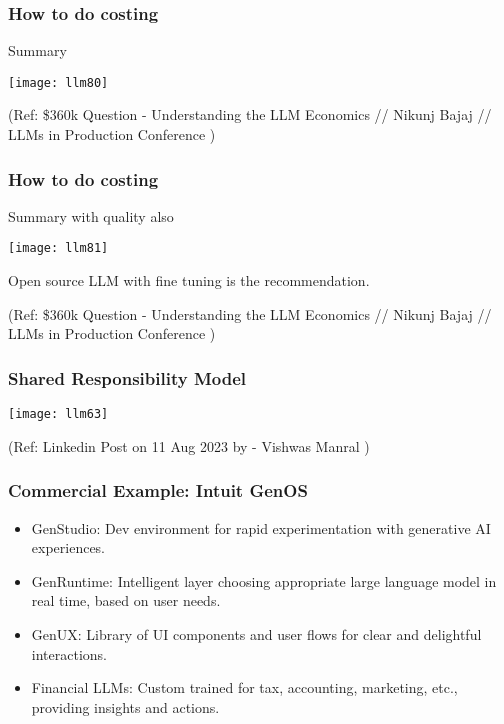 \begin{frame}[fragile]\frametitle{How to do costing}

Summary 

\begin{center}
\texttt{[image: llm80]}
\end{center}		



{\tiny (Ref: \$360k Question - Understanding the LLM Economics // Nikunj Bajaj // LLMs in Production Conference )}

\end{frame}

\begin{frame}[fragile]\frametitle{How to do costing}

Summary with quality also

\begin{center}
\texttt{[image: llm81]}
\end{center}		

Open source LLM with fine tuning is the recommendation.


{\tiny (Ref: \$360k Question - Understanding the LLM Economics // Nikunj Bajaj // LLMs in Production Conference )}

\end{frame}




\begin{frame}[fragile]\frametitle{Shared Responsibility Model}

\begin{center}
\texttt{[image: llm63]}
\end{center}		


{\tiny (Ref: Linkedin Post on 11 Aug 2023 by - Vishwas Manral )}

\end{frame}


\begin{frame}[fragile]\frametitle{Commercial Example: Intuit GenOS}

\begin{itemize}
    \item GenStudio: Dev environment for rapid experimentation with generative AI experiences.
    \item GenRuntime: Intelligent layer choosing appropriate large language model in real time, based on user needs.
    \item GenUX: Library of UI components and user flows for clear and delightful interactions.
    \item Financial LLMs: Custom trained for tax, accounting, marketing, etc., providing insights and actions.
\end{itemize}

\end{frame}

